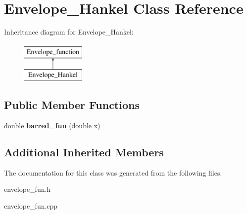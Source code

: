 \hypertarget{classEnvelope__Hankel}{}\section{Envelope\+\_\+\+Hankel Class Reference}
\label{classEnvelope__Hankel}
Inheritance diagram for Envelope\+\_\+\+Hankel\+:\begin{figure}[H]
\begin{center}
\leavevmode
\includegraphics[height=2.000000cm]{classEnvelope__Hankel}
\end{center}
\end{figure}
\subsection*{Public Member Functions}
\begin{DoxyCompactItemize}
\item 
\mbox{\label{classEnvelope__Hankel_a1b95e93f11401450c57a047f0979acc8}} 
double {\bfseries barred\+\_\+fun} (double x)
\end{DoxyCompactItemize}
\subsection*{Additional Inherited Members}


The documentation for this class was generated from the following files\+:\begin{DoxyCompactItemize}
\item 
envelope\+\_\+fun.\+h\item 
envelope\+\_\+fun.\+cpp\end{DoxyCompactItemize}
